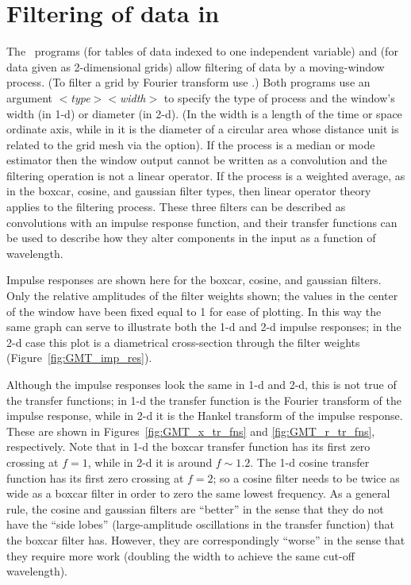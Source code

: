 %
%
\chapter{Filtering of data in \gmt}
\thispagestyle{headings}

The \GMT\ programs  (for tables of data indexed
to one independent variable) and  (for data
given as 2-dimensional grids) allow filtering of data by a
moving-window process.  (To filter a grid by Fourier transform use
.)  Both programs use an argument
$<${\it type}$><${\it width}$>$ to specify the type of
process and the window's width (in 1-d) or diameter (in 2-d).
(In  the width is a length of the time or
space ordinate axis, while in  it is the
diameter of a circular area whose distance unit is related to
the grid mesh via the  option). If the process is a
median or mode estimator then the window 
output cannot be written as a convolution and the filtering
operation is not a linear operator.  If the process is a weighted
average, as in the boxcar, cosine, and gaussian filter types, 
then linear operator theory applies to the filtering process.
These three filters can be described as convolutions with an
impulse response function, and their transfer functions 
can be used to describe how they alter components in the input
as a function of wavelength.

Impulse responses are shown here for the boxcar, cosine, and
gaussian filters.  Only the relative amplitudes of the filter
weights shown; the values in the center of the window have 
been fixed equal to 1 for ease of plotting.  In this way the
same graph can serve to illustrate both the 1-d and 2-d impulse
responses; in the 2-d case this plot is a diametrical
cross-section through the filter weights (Figure~\ref{fig:GMT_imp_res}).


Although the impulse responses look the same in 1-d and 2-d,
this is not true of the transfer functions; in 1-d the transfer
function is the Fourier transform of the impulse response, 
while in 2-d it is the Hankel transform of the impulse response.
These are shown in Figures~\ref{fig:GMT_x_tr_fns} and
\ref{fig:GMT_r_tr_fns}, respectively.  Note that in 1-d the boxcar transfer
function has its first zero crossing at $f = 1$, while in 2-d 
it is around $f \sim 1.2$.  The 1-d cosine transfer function
has its first zero crossing at $f = 2$; so a cosine filter needs
to be twice as wide as a boxcar filter in order to zero the same
lowest frequency.  As a general rule, the cosine and gaussian
filters are ``better'' in the sense that they do not have the
``side lobes'' (large-amplitude oscillations in the transfer
function) that the boxcar filter has.  However, they are
correspondingly ``worse'' in the sense that they require more
work (doubling the width to achieve the same cut-off wavelength).

